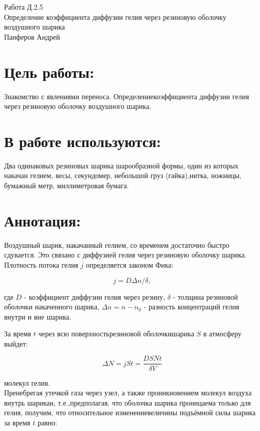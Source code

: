 




\begin{center}
  \LARGE{Работа Д.2.5}\\[0.2cm]
  \LARGE{Определение коэффициента диффузии гелия через резиновую оболочку воздушного шарика}\\[0.2cm]
  \large{Панферов Андрей}\\[0.2cm]
\end{center}  
  
\section{Цель работы:}

Знакомство с явлениями переноса. Определениекоэффициента диффузии гелия через резиновую оболочку воздушного шарика.\\

\section{В работе используются:}

Два одинаковых резиновых шарика шарообразной формы, один из которых накачан гелием, весы, секундомер, небольшой груз (гайка),нитка, ножницы, бумажный метр, миллиметровая бумага.

\section{Аннотация:}

Воздушный шарик, накачанный гелием, со временем достаточно быстро сдувается. Это связано с диффузией гелия через резиновую оболочку шарика. Плотность потока гелия $j$ определяется законом Фика:

\[j = D \Delta n / \delta,\]

где $D$ - коэффициент диффузии гелия через резину, $\delta$ - толщина резиновой оболочки накаченного шарика, $\Delta n = n - n_0$ - разность концентраций гелия внутри и вне шарика.

За время $t$ через всю поверхностьрезиновой оболочкишарика $S$ в атмосферу выйдет:

\[\Delta N = jSt = \frac{DSNt}{\delta V}\]

молекул гелия.\\

Пренебрегая утечкой газа через узел, а также проникновением молекул воздуха внутрь шарикаи, т.е.,предполагая, что оболочка шарика проницаема только для гелия, получим, что относительное изменениевеличины подъёмной силы шарика за время $t$ равно:

